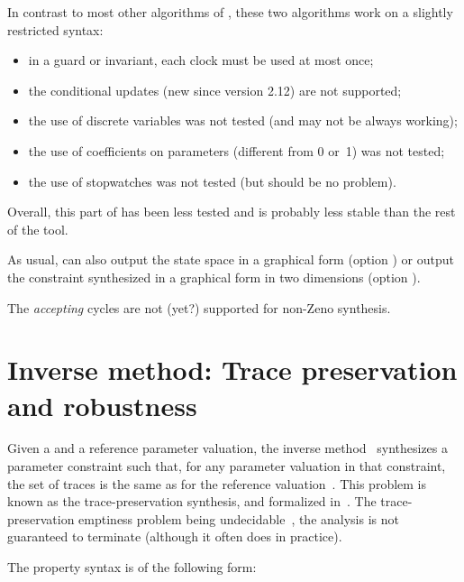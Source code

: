\begin{becareful}[restrictions]
	In contrast to most other algorithms of \imitator{}, these two algorithms work on a slightly restricted syntax:
	\begin{itemize}
		\item in a guard or invariant, each clock must be used at most once;
		\item the conditional updates (new since version 2.12) are not supported;
		\item the use of discrete variables was not tested (and may not be always working);
		\item the use of coefficients on parameters (different from 0 or~1) was not tested;
		\item the use of stopwatches was not tested (but should be no problem).
	\end{itemize}
	Overall, this part of \imitator{} has been less tested and is probably less stable than the rest of the tool.
\end{becareful}

As usual, \imitator{} can also
output the state space in a graphical form (option )
or
output the constraint synthesized in a graphical form in two dimensions (option ).

\begin{remark}
	The \emph{accepting} cycles are not (yet?) supported for non-Zeno synthesis.
\end{remark}



\section{Inverse method: Trace preservation and robustness}\label{ss:mode:IM}

Given a \NIPTA{} and a reference parameter valuation, the inverse method~\IM{} synthesizes a parameter constraint such that, for any parameter valuation in that constraint, the set of traces is the same as for the reference valuation~\cite{ACEF09}.
This problem is known as the trace-preservation synthesis, and formalized in~\cite{AM15}.
The trace-preservation emptiness problem being undecidable~\cite{AM15}, the analysis is not guaranteed to terminate (although it often does in practice).

The property syntax is of the following form:

